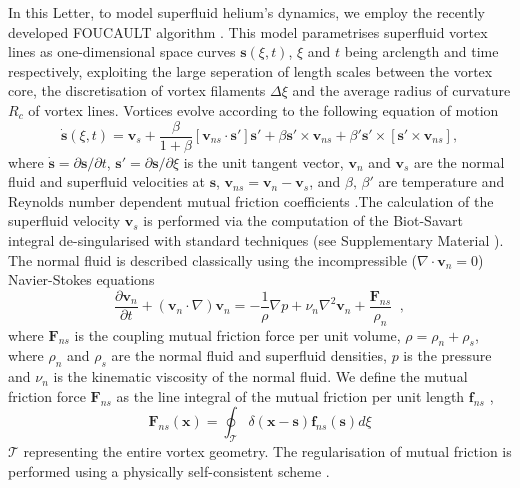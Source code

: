 \documentclass[%
 reprint,
 amsmath,amssymb,
 aps,
 prl,
]{revtex4-2}
\def \s{\mathbf{s}}
\def \v{\mathbf{v}}
\def \x{\mathbf{x}}
\begin{document}
{In this Letter, to model superfluid helium's dynamics, we employ the recently developed FOUCAULT algorithm \cite{galantucciNewSelfconsistentApproach2020b}. This model parametrises superfluid vortex lines as one-dimensional space curves $\s(\xi,t)$, $\xi$ and $t$ being arclength and time respectively, exploiting the large seperation of length scales between the vortex core, the discretisation of vortex filaments $\Delta\xi$ and the average radius of curvature $R_c$ of vortex lines. Vortices evolve according to the following equation of motion 
\begin{equation}
    \dot{\s}(\xi,t) = \v_s + \frac{\beta}{1+\beta}\left[\v_{ns}\cdot\s'\right]\s' + \beta\s'\times\v_{ns} + \beta'\s'\times\left[\s'\times\v_{ns}\right],
\end{equation}
where $\dot{\s} = \partial\s/\partial t$, $\s' = \partial\s/\partial\xi$ is the unit tangent vector, $\v_n$ and $\v_s$ are the normal fluid and superfluid velocities at $\s$, $\v_{ns} = \v_n-\v_s$, and $\beta,\, \beta'$ are temperature and Reynolds number dependent mutual friction coefficients \cite{galantucciNewSelfconsistentApproach2020b}.The calculation of the superfluid velocity $\v_s$ is performed via the computation of the Biot-Savart integral de-singularised with standard techniques (see Supplementary Material \cite{suppMat}). The normal fluid is described classically using the incompressible ($\nabla\cdot\v_n=0$) Navier-Stokes equations
\begin{equation}
    \frac{\partial\v_n}{\partial t} + (\v_n\cdot\nabla)\v_n = -\frac{1}{\rho}\nabla p  + \nu_n\nabla^2\v_n + \frac{\mathbf{F}_{ns}}{\rho_n} \; \; , 
\end{equation}
where $\mathbf{F}_{ns}$ is the coupling mutual friction force per unit volume, $\rho=\rho_n + \rho_s$, where $\rho_n$ and $\rho_s$ are the normal fluid and superfluid densities, $p$ is the pressure and $\nu_n$ is the kinematic viscosity of the normal fluid. We define the mutual friction force $\mathbf{F}_{ns}$ as the line integral of the mutual friction per unit length $\mathbf{f}_{ns}$ \cite{suppMat},
\begin{equation}
    \mathbf{F}_{ns}(\x) = \oint_{\mathcal{T}}\delta(\x-\s)\mathbf{f}_{ns}(\s)d\xi     
\end{equation}
$\mathcal{T}$ representing the entire vortex geometry. The regularisation of mutual friction is performed using a physically self-consistent scheme \cite{galantucciNewSelfconsistentApproach2020b, gualtieri2015exact, gualtieri2017turbulence}.

}
\end{document}
